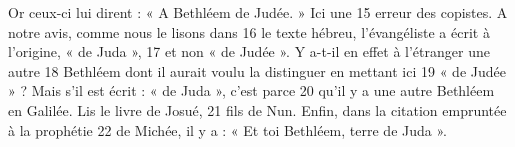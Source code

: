 Or ceux-ci lui dirent : « A Bethléem de Judée. » Ici une	 
15	 	erreur des copistes. A notre avis, comme nous le lisons dans	 
16	 	le texte hébreu, l'évangéliste a écrit à l'origine, « de Juda »,	 
17	 	et non « de Judée ». Y a-t-il en effet à l'étranger une autre	 
18	 	Bethléem dont il aurait voulu la distinguer en mettant ici	 
19	 	« de Judée » ? Mais s'il est écrit : « de Juda », c'est parce	 
20	 	qu'il y a une autre Bethléem en Galilée. Lis le livre de Josué,	 
21	 	fils de Nun. Enfin, dans la citation empruntée à la prophétie	 
22	 	de Michée, il y a : « Et toi Bethléem, terre de Juda ».